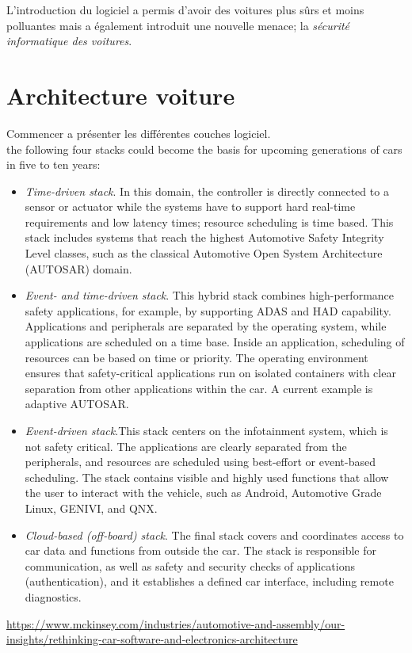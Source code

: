 L'introduction du logiciel a permis d'avoir des voitures plus s\^urs et moins polluantes mais a \'egalement introduit une nouvelle menace; la \emph{s\'ecurit\'e informatique des voitures}. 

\section {Architecture voiture}

\begin{tbd}
Commencer a pr\'esenter les diff\'erentes couches logiciel.\\

the following four stacks could become the basis for upcoming generations of cars in five to ten years:
\begin{itemize}

\item \emph{Time-driven stack}. In this domain, the controller is directly connected to a sensor or actuator while the systems have to support hard real-time requirements and low latency times; resource scheduling is time based. This stack includes systems that reach the highest Automotive Safety Integrity Level classes, such as the classical Automotive Open System Architecture (AUTOSAR) domain.
\item \emph{Event- and time-driven stack}. This hybrid stack combines high-performance safety applications, for example, by supporting ADAS and HAD capability. Applications and peripherals are separated by the operating system, while applications are scheduled on a time base. Inside an application, scheduling of resources can be based on time or priority. The operating environment ensures that safety-critical applications run on isolated containers with clear separation from other applications within the car. A current example is adaptive AUTOSAR.
\item \emph{Event-driven stack}.This stack centers on the infotainment system, which is not safety critical. The applications are clearly separated from the peripherals, and resources are scheduled using best-effort or event-based scheduling. The stack contains visible and highly used functions that allow the user to interact with the vehicle, such as Android, Automotive Grade Linux, GENIVI, and QNX.
\item \emph{Cloud-based (off-board) stack}. The final stack covers and coordinates access to car data and functions from outside the car. The stack is responsible for communication, as well as safety and security checks of applications (authentication), and it establishes a defined car interface, including remote diagnostics.
\end{itemize}

\url{https://www.mckinsey.com/industries/automotive-and-assembly/our-insights/rethinking-car-software-and-electronics-architecture}
\end{tbd}


